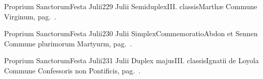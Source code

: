 \documentclass[liber-responsorialis.tex]{subfiles}
\begin{document}
	{Proprium Sanctorum}{Festa Julii}{2}{29 Julii}
	{Semiduplex}{III. classis}{Marthæ}
	{Commune Virginum, pag.\ \pageref{M-MU}.}
	{}

	{Proprium Sanctorum}{Festa Julii}{2}{30 Julii}
	{Simplex}{Commemoratio}{Abdon et Sennen}
	{Commune plurimorum Martyurm, pag.\ \pageref{M-PMEX}.}
	{}

	{Proprium Sanctorum}{Festa Julii}{2}{31 Julii}
	{Duplex majus}{III. classis}{Ignatii de Loyola}
	{Commune Confessoris non Pontificis, pag.\ \pageref{M-CONP}.}
	{}
\end{document}
